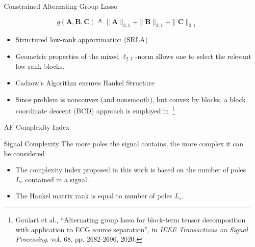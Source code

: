 \documentclass{beamer}
\begin{document}
	\begin{frame}{Constrained Alternating Group Lasso}
		
		\begin{equation}
			g(\mathbf{A}, \mathbf{B}, \mathbf{C}) \triangleq 
						 \| \mathbf{A} \|_{2,1} + \| \mathbf{B} \|_{2,1} + \| \mathbf{C} \|_{2,1}
	 \end{equation}

		\begin{itemize}
			\item Structured low-rank approximation (SRLA)
			\item Geometric properties of the mixed $\ell_{2,1}$-norm allows one to select the relevant low-rank blocks.
			\item Cadzow's Algorithm ensures Hankel Structure
			\item Since problem is nonconvex (and nonsmooth), but convex by blocks, a block coordinate descent (BCD) approach is employed in~\footnote{Goulart et al., ``Alternating group lasso for block-term tensor decomposition with application to ECG source separation'', in \textit{IEEE Transactions on Signal Processing}, vol. 68, pp. 2682-2696, 2020.}
		\end{itemize}
		
	\end{frame}

	\begin{frame}{AF Complexity Index}
		
		\begin{block}{Signal Complexity}
			The more poles the signal contains, the more complex it can be considered
		\end{block}
		
		\begin{itemize}
			\item The complexity index proposed in this work is based on the number of poles $L_{r}$ contained in a signal. 
			\item The Hankel matrix rank is equal to number of poles $L_{r}$.
		\end{itemize}

	\end{frame}
	
\end{document}
